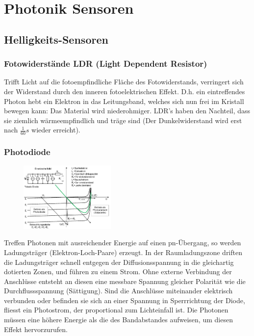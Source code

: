 \section{Photonik Sensoren}
\subsection{Helligkeits-Sensoren}
\subsubsection{Fotowiderstände LDR (Light Dependent Resistor)}
Trifft Licht auf die fotoempfindliche Fläche des Fotowiderstands, verringert sich der Widerstand durch den inneren fotoelektrischen Effekt. D.h. ein eintreffendes Photon hebt ein Elektron in das Leitungsband, welches sich nun frei im Kristall bewegen kann: Das Material wird niederohmiger. LDR's haben den Nachteil, dass sie ziemlich wärmeempfindlich und träge sind (Der Dunkelwiderstand wird erst nach $\frac{1}{60}s$ wieder erreicht).

\subsubsection{Photodiode}
\begin{figure}
    \centering
    \includegraphics[width=0.42\textwidth]{images/photodiode}
\end{figure}
Treffen Photonen mit ausreichender Energie auf einen pn-Übergang, so werden Ladungsträger (Elektron-Loch-Paare) erzeugt. In der Raumladungszone driften die Ladungsträger schnell entgegen der Diffusionsspannung in die gleichartig dotierten Zonen, und führen zu einem Strom. Ohne externe Verbindung der Anschlüsse entsteht an diesen eine messbare Spannung gleicher Polarität wie die Durchflussspannung (Sättigung). Sind die Anschlüsse miteinander elektrisch verbunden oder befinden sie sich an einer Spannung in Sperrrichtung der Diode, fliesst ein Photostrom, der proportional zum Lichteinfall ist. Die Photonen müssen eine höhere Energie als die des Bandabstandes aufweisen, um diesen Effekt hervorzurufen.

